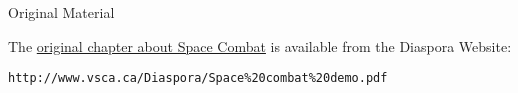 \begin{sidebox}{Original Material}

The \href{http://www.vsca.ca/Diaspora/Space%20combat%20demo.pdf}{original chapter about Space Combat}
is available from the Diaspora Website:
\begin{center}\verb#http://www.vsca.ca/Diaspora/Space%20combat%20demo.pdf#\end{center}
\end{sidebox}
